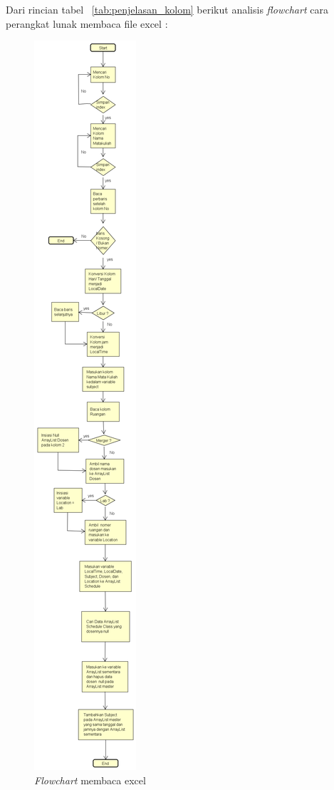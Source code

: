 Dari rincian tabel ~\ref{tab:penjelasan_kolom} berikut analisis \textit{flowchart} cara perangkat lunak membaca file excel : 
\begin{figure}[H]
	\centering
	\includegraphics[scale=0.3]{Gambar/FlowchartBacaExcel}
	\caption{\textit{Flowchart} membaca excel}
	\label{fig:flowchartMembacaExcel}
	\end{figure}
